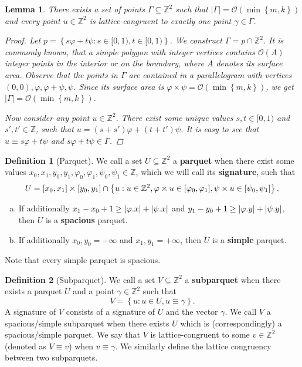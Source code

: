\documentclass[11pt]{article}
\newcommand{\Z}{\mathbb{Z}}
\renewcommand{\O}{\mathcal{O}}
\renewcommand{\phi}{\varphi}
\newcommand{\set}[1]{\left\lbrace #1 \right\rbrace}
\theoremstyle{plain}
\newtheorem{lemma}{Lemma}
\theoremstyle{definition}
\newtheorem{definition}{Definition}
\theoremstyle{remark}
\begin{document}
\begin{lemma} \label{lattice_base}
	There exists a set of points $\Gamma \subseteq \Z^2$ such that $|\Gamma| = \O(\min\set{m, k})$ and every point $u \in \Z^2$ is lattice-congruent to exactly one point $\gamma \in \Gamma$.
	\begin{proof}
		Let $p = \set{s\phi + t\psi : s \in [0, 1), t \in [0, 1)}$.
		We construct $\Gamma = p \cap \Z^2$.
		It is commonly known, that a simple polygon with integer vertices contains $\O(A)$ integer points in the interior or on the boundary, where $A$ denotes its surface area.
		Observe that the points in $\Gamma$ are contained in a parallelogram with vertices $(0, 0), \phi, \phi + \psi, \psi$.
		Since its surface area is $\phi \times \psi = \O(\min\set{m, k})$, we get $|\Gamma| = \O(\min\set{m, k})$.
		
		Now consider any point $u \in \Z^2$.
		There exist some unique values $s, t \in [0, 1)$ and $s', t' \in \Z$, such that
		$u = (s + s') \phi + (t + t') \psi$.
		It is easy to see that
		$u \equiv s\phi + t\psi$ and $s\phi + t\psi \in \Gamma$.
	\end{proof}
\end{lemma}


\begin{definition}[Parquet]\label{parquet_definition}
	We call a set $U \subseteq \Z^2$ a \textbf{parquet} when there exist some values $x_0, x_1, y_0, y_1, \phi_0, \phi_1, \psi_0, \psi_1 \in \Z$, which we will call its \textbf{signature}, such that
	$$ U = [x_0, x_1] \times [y_0, y_1] \cap \set{u : u \in \Z^2, \h{u} \in [\phi_0, \phi_1], \s{u} \in [\psi_0, \psi_1]}. $$
	\begin{enumerate}[a)]
		\item If additionally $x_1 - x_0 + 1 \ge |\x{\phi}| + |\x{\psi}|$ and $y_1 - y_0 + 1 \ge |\y{\phi}| + |\y{\psi}|$, then $U$ is a \textbf{spacious} parquet.
		\item If additionally $x_0, y_0 = -\infty$ and $x_1, y_1 = +\infty$, then $U$ is a \textbf{simple} parquet.
	\end{enumerate}
	Note that every simple parquet is spacious.
\end{definition}


\begin{definition}[Subparquet]\label{subparquet_definition}
	We call a set $V \subseteq \Z^2$ a \textbf{subparquet} when there exists a parquet $U$ and a point $\gamma \in \Z^2$ such that
	$$ V = \set{u : u \in U, u \equiv \gamma}.$$
	A signature of $V$ consists of a signature of $U$ and the vector $\gamma$.
	We call $V$ a spacious/simple subparquet when there exists $U$ which is (correspondingly) a spacious/simple parquet.
	We say that $V$ is lattice-congruent to some $v \in \Z^2$ (denoted as $V \equiv v$) when $v \equiv \gamma$.
	We similarly define the lattice congruency between two subparquets.
\end{definition}
\end{document}
